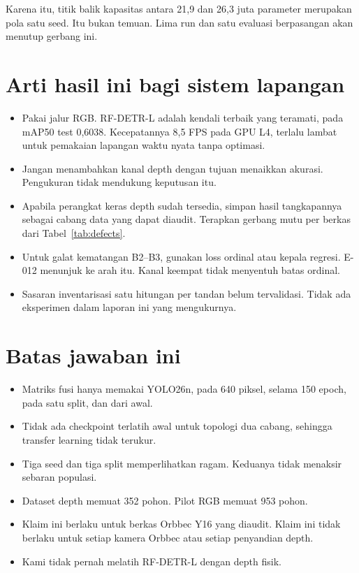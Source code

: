 \documentclass[preprint,12pt]{elsarticle}
\newcommand{\E}[1]{E-#1}
\newcommand{\mAP}{mAP}
\begin{document}
Karena itu, titik balik kapasitas antara 21,9 dan 26,3 juta parameter merupakan
pola satu seed. Itu bukan temuan. Lima run dan satu evaluasi berpasangan akan
menutup gerbang ini.

\section{Arti hasil ini bagi sistem lapangan}
\label{sec:consequence}

\begin{itemize}
\item Pakai jalur RGB. RF-DETR-L adalah kendali terbaik yang teramati, pada
\mAP50 test 0,6038. Kecepatannya 8,5 FPS pada GPU L4, terlalu lambat untuk
pemakaian lapangan waktu nyata tanpa optimasi.
\item Jangan menambahkan kanal depth dengan tujuan menaikkan akurasi.
Pengukuran tidak mendukung keputusan itu.
\item Apabila perangkat keras depth sudah tersedia, simpan hasil tangkapannya
sebagai cabang data yang dapat diaudit. Terapkan gerbang mutu per berkas dari
Tabel~\ref{tab:defects}.
\item Untuk galat kematangan B2--B3, gunakan loss ordinal atau kepala regresi.
\E{012} menunjuk ke arah itu. Kanal keempat tidak menyentuh batas ordinal.
\item Sasaran inventarisasi satu hitungan per tandan belum tervalidasi. Tidak
ada eksperimen dalam laporan ini yang mengukurnya.
\end{itemize}

\section{Batas jawaban ini}
\label{sec:limits}

\begin{itemize}
\item Matriks fusi hanya memakai YOLO26n, pada 640 piksel, selama 150 epoch,
pada satu split, dan dari awal.
\item Tidak ada checkpoint terlatih awal untuk topologi dua cabang, sehingga
transfer learning tidak terukur.
\item Tiga seed dan tiga split memperlihatkan ragam. Keduanya tidak menaksir
sebaran populasi.
\item Dataset depth memuat 352 pohon. Pilot RGB memuat 953 pohon.
\item Klaim ini berlaku untuk berkas Orbbec Y16 yang diaudit. Klaim ini tidak
berlaku untuk setiap kamera Orbbec atau setiap penyandian depth.
\item Kami tidak pernah melatih RF-DETR-L dengan depth fisik.
\end{itemize}
\end{document}
